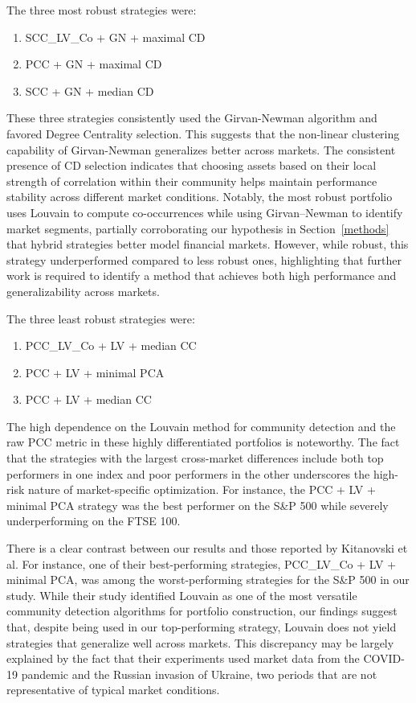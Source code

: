 \documentclass[acmsmall,screen,nonacm]{acmart}
\begin{document}
The three most robust strategies were:
\begin{enumerate}
    \item SCC\_LV\_Co + GN + maximal CD
    \item PCC + GN + maximal CD
    \item SCC + GN + median CD
\end{enumerate}
These three strategies consistently used the Girvan-Newman algorithm and favored Degree Centrality selection.
This suggests that the non-linear clustering capability of Girvan-Newman generalizes better across markets.
The consistent presence of CD selection indicates that choosing assets based on their local strength of correlation within their community helps maintain performance stability across different market conditions.
Notably, the most robust portfolio uses Louvain to compute co-occurrences while using Girvan–Newman to identify market segments, partially corroborating our hypothesis in Section~\ref{methods} that hybrid strategies better model financial markets.
However, while robust, this strategy underperformed compared to less robust ones, highlighting that further work is required to identify a method that achieves both high performance and generalizability across markets.

The three least robust strategies were:
\begin{enumerate}
    \item PCC\_LV\_Co + LV + median CC
    \item PCC + LV + minimal PCA
    \item PCC + LV + median CC
\end{enumerate}
The high dependence on the Louvain method for community detection and the raw PCC metric in these highly differentiated portfolios is noteworthy.
The fact that the strategies with the largest cross-market differences include both top performers in one index and poor performers in the other underscores the high-risk nature of market-specific optimization.
For instance, the PCC + LV + minimal PCA strategy was the best performer on the S\&P 500 while severely underperforming on the FTSE 100.

There is a clear contrast between our results and those reported by Kitanovski et al.
For instance, one of their best-performing strategies, PCC\_LV\_Co + LV + minimal PCA, was among the worst-performing strategies for the S\&P 500 in our study.
While their study identified Louvain as one of the most versatile community detection algorithms for portfolio construction, our findings suggest that, despite being used in our top-performing strategy, Louvain does not yield strategies that generalize well across markets.
This discrepancy may be largely explained by the fact that their experiments used market data from the COVID-19 pandemic and the Russian invasion of Ukraine, two periods that are not representative of typical market conditions.
\end{document}
